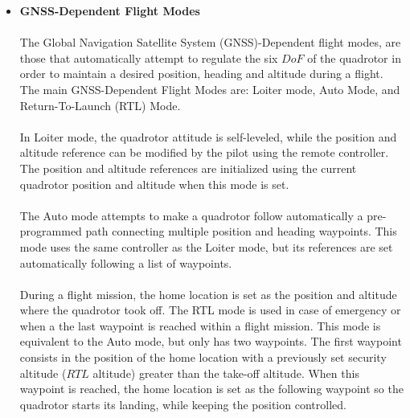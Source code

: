 \begin{itemize}
\item \textbf{GNSS-Dependent Flight Modes}\\\\
The Global Navigation Satellite System (GNSS)-Dependent flight modes, are those that automatically attempt to regulate the six $DoF$ of the quadrotor in order to maintain a desired position, heading and altitude during a flight. The main GNSS-Dependent Flight Modes are: Loiter mode, Auto Mode, and Return-To-Launch (RTL) Mode.
\\\\
In Loiter mode, the quadrotor attitude is self-leveled, while the position and altitude reference can be modified by the pilot using the remote controller. The position and altitude references are initialized using the current quadrotor position and altitude when this mode is set. 
\\\\
The Auto mode attempts to make a quadrotor follow automatically a pre-programmed path connecting multiple position and heading waypoints. This mode uses the same controller as the Loiter mode, but its references are set automatically following a list of waypoints. 
\\\\
During a flight mission, the home location is set as the position and altitude where the quadrotor took off. The RTL mode is used in case of emergency or when a the last waypoint is reached within a flight mission. This mode is equivalent to the Auto mode, but only has two waypoints. The first waypoint consists in the position of the home location with a previously set security altitude ($RTL$ altitude) greater than the take-off altitude. When this waypoint is reached, the home location is set as the following waypoint so the quadrotor starts its landing, while keeping the position controlled.
\end{itemize}



